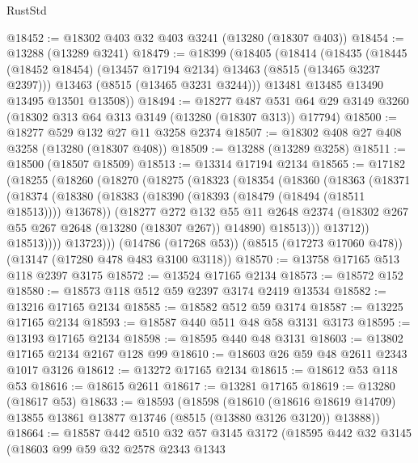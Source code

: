 \begin{lexlean}{RustStd}
\begin{coremodule}
@18452 := @18302 @403 @32 @403 @3241 (@13280 (@18307 @403))
@18454 := @13288 (@13289 @3241)
@18479 := @18399
    (@18405
      (@18414
        (@18435
          (@18445 (@18452 @18454) (@13457 @17194 @2134) @13463 (@8515 (@13465 @3237 @2397)))
          @13463
          (@8515 (@13465 @3231 @3244)))
        @13481
        @13485
        @13490
        @13495
        @13501
        @13508))
@18494 := @18277
    @487
    @531
    @64
    @29
    @3149
    @3260
    (@18302 @313 @64 @313 @3149 (@13280 (@18307 @313)) @17794)
@18500 := @18277 @529 @132 @27 @11 @3258 @2374
@18507 := @18302 @408 @27 @408 @3258 (@13280 (@18307 @408))
@18509 := @13288 (@13289 @3258)
@18511 := @18500 (@18507 @18509)
@18513 := @13314 @17194 @2134
@18565 := @17182
    (@18255
      (@18260
        (@18270
          (@18275
            (@18323
              (@18354
                (@18360
                  (@18363
                    (@18371
                      (@18374
                        (@18380
                          (@18383 (@18390 (@18393 (@18479 (@18494 (@18511 @18513)))) @13678))
                          (@18277
                            @272
                            @132
                            @55
                            @11
                            @2648
                            @2374
                            (@18302 @267 @55 @267 @2648 (@13280 (@18307 @267)) @14890)
                            @18513)))
                      @13712))
                  @18513))))
          @13723)))
    (@14786 (@17268 @53))
    (@8515 (@17273 @17060 @478))
    (@13147 (@17280 @478 @483 @3100 @3118))
@18570 := @13758 @17165 @513 @118 @2397 @3175
@18572 := @13524 @17165 @2134
@18573 := @18572 @152
@18580 := @18573 @118 @512 @59 @2397 @3174 @2419 @13534
@18582 := @13216 @17165 @2134
@18585 := @18582 @512 @59 @3174
@18587 := @13225 @17165 @2134
@18593 := @18587 @440 @511 @48 @58 @3131 @3173
@18595 := @13193 @17165 @2134
@18598 := @18595 @440 @48 @3131
@18603 := @13802 @17165 @2134 @2167 @128 @99
@18610 := @18603 @26 @59 @48 @2611 @2343 @1017 @3126
@18612 := @13272 @17165 @2134
@18615 := @18612 @53 @118 @53
@18616 := @18615 @2611
@18617 := @13281 @17165
@18619 := @13280 (@18617 @53)
@18633 := @18593
    (@18598
      (@18610
        (@18616 @18619 @14709)
        @13855
        @13861
        @13877
        @13746
        (@8515 (@13880 @3126 @3120))
        @13888))
@18664 := @18587
    @442
    @510
    @32
    @57
    @3145
    @3172
    (@18595
      @442
      @32
      @3145
      (@18603
        @99
        @59
        @32
        @2578
        @2343
        @1343

\end{coremodule}
\end{lexlean}
